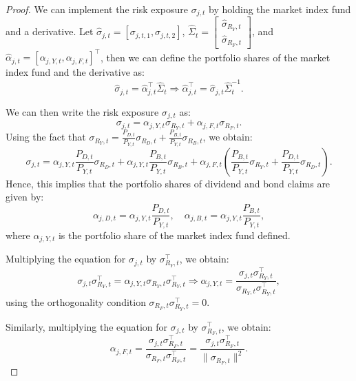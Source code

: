 \begin{proof}
We can implement the risk exposure $\sigma_{j,t}$ by holding the market index fund and a derivative.
Let $\hat{\sigma}_{j,t} = [\sigma_{j,t,1}, \sigma_{j,t,2}]$, $\hat{\Sigma}_{t} = \left[\begin{matrix}
 \hat{\sigma}_{R_Y,t} \\
 \hat{\sigma}_{R_F,t}
\end{matrix}\right]$, and $\hat{\alpha}_{j,t} = [\alpha_{j,Y,t}, \alpha_{j,F,t}]^\top$, then we can define the portfolio shares of the market index fund and the derivative as:
\begin{equation}
    \hat{\sigma}_{j,t} = \hat{\alpha}_{j,t}^\top \hat{\Sigma}_{t} \Rightarrow \hat{\alpha}_{j,t}^\top = \hat{\sigma}_{j,t} \hat{\Sigma}_{t}^{-1}.
\end{equation}

We can then write the risk exposure $\sigma_{j,t}$ as:
\begin{equation}
    \sigma_{j,t} = \alpha_{j,Y,t} \sigma_{R_Y,t} + \alpha_{j,F,t} \sigma_{R_F,t}.
\end{equation}
Using the fact that $\sigma_{R_Y,t} = \frac{P_{D,t}}{P_{Y,t}} \sigma_{R_D,t} + \frac{P_{B,t}}{P_{Y,t}} \sigma_{R_B,t}$, we obtain:
\begin{equation}
    \sigma_{j,t} = \alpha_{j,Y,t} \frac{P_{D,t}}{P_{Y,t}} \sigma_{R_D,t} + \alpha_{j,Y,t} \frac{P_{B,t}}{P_{Y,t}} \sigma_{R_B,t} + \alpha_{j,F,t} \left( \frac{P_{B,t}}{P_{Y,t}} \sigma_{R_Y,t} + \frac{P_{D,t}}{P_{Y,t}} \sigma_{R_D,t} \right).
\end{equation}
Hence, this implies that the portfolio shares of dividend and bond claims are given by:
\begin{equation}
    \alpha_{j,D,t} = \alpha_{j,Y,t} \frac{P_{D,t}}{P_{Y,t}},
    \quad
    \alpha_{j,B,t} = \alpha_{j,Y,t} \frac{P_{B,t}}{P_{Y,t}},
\end{equation}
where $\alpha_{j,Y,t}$ is the portfolio share of the market index fund defined.

Multiplying the equation for $\sigma_{j,t}$ by $\sigma_{R_Y,t}^\top$, we obtain:
\begin{equation}
    \sigma_{j,t} \sigma_{R_Y,t}^\top = \alpha_{j,Y,t} \sigma_{R_Y,t} \sigma_{R_Y,t}^\top \Rightarrow \alpha_{j,Y,t} = \frac{\sigma_{j,t} \sigma_{R_Y,t}^\top}{\sigma_{R_Y,t} \sigma_{R_Y,t}^\top},
\end{equation}
using the orthogonality condition $\sigma_{R_F,t} \sigma_{R_Y,t}^\top = 0$.

Similarly, multiplying the equation for $\sigma_{j,t}$ by $\sigma_{R_F,t}^\top$, we obtain:
\begin{equation}
    \alpha_{j,F,t} = \frac{\sigma_{j,t} \sigma_{R_F,t}^\top}{\sigma_{R_F,t} \sigma_{R_F,t}^\top} = \frac{\sigma_{j,t} \sigma_{R_F,t}^\top}{\|\sigma_{R_F,t}\|^2}.
\end{equation}


\end{proof}
